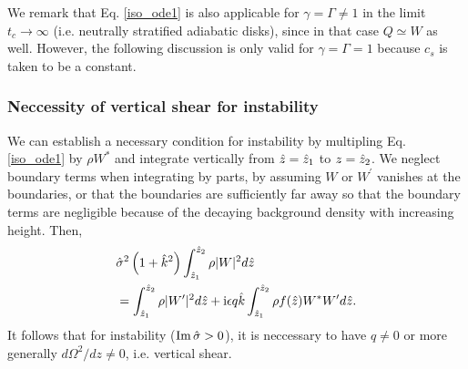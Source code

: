 We remark that Eq. \ref{iso_ode1} is also applicable for  $\gamma=\Gamma\neq 1$ in the
limit $t_c\to\infty$ (i.e. neutrally stratified adiabatic disks),
since in that case $Q\simeq W$ as well. However, the following
discussion is only  valid for $\gamma=\Gamma=1$ because $c_s$ is taken
to be a constant.    


\subsubsection{Neccessity of vertical shear for
  instability}\label{integral_relation} 
We can establish a necessary condition for instability by multipling
Eq. \ref{iso_ode1} by $\rho W^*$ and integrate vertically from
$\hat{z}=\hat{z}_1$ to $z=\hat{z}_2$. We neglect boundary 
terms when integrating by parts, by assuming $W$ or
$W^\prime$ vanishes at the boundaries, or that the boundaries are 
sufficiently far away so that the boundary terms are negligible because of the
decaying background density with increasing height. Then,
\begin{align}
  &\hat{\sigma}^2\left(1+\hat{k}^2\right)\int_{\hat{z}_1}^{\hat{z}_2}\rho|W|^2d\hat{z} \notag\\
  &=\int_{\hat{z}_1}^{\hat{z}_2}\rho|W^\prime|^2d\hat{z} 
  +\mathrm{i} \epsilon q \hat{k}\int_{\hat{z}_1}^{\hat{z}_2}\rho f(\hat{z}) W^*W^\prime d\hat{z}.\label{integral_relation1}
\end{align}
It follows that for instability ($\operatorname{Im}\hat{\sigma}>0$), it is neccessary to
have $q\neq0$ or more generally $d\Omega^2/dz\neq 0$, i.e. vertical shear.  


